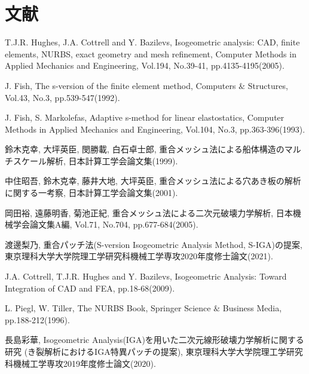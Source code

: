 \chapter{文献}
\begin{list}{}{\setlength{\leftmargin}{2em}\setlength{\itemindent}{-2em}\setlength{\topsep}{0pt}}
 \item T.J.R. Hughes,
       J.A. Cottrell and Y. Bazilevs,
       Isogeometric analysis: CAD,
       finite elements,
       NURBS,
       exact geometry and mesh refinement,
       Computer Methods in Applied Mechanics and Engineering,
       Vol.194,
       No.39-41,
       pp.4135-4195(2005).
\item  J. Fish,
       The s-version of the finite element method,
       Computers $\&$ Structures,
       Vol.43,
       No.3,
       pp.539-547(1992).
\item  J. Fish,
       S. Markolefas,
       Adaptive s-method for linear elastostatics,
       Computer Methods in Applied Mechanics and Engineering,
       Vol.104,
       No.3,
       pp.363-396(1993).
\item  鈴木克幸,
       大坪英臣,
       閔勝載,
       白石卓士郎,
       重合メッシュ法による船体構造のマルチスケール解析,
       日本計算工学会論文集(1999).
\item  中住昭吾,
       鈴木克幸,
       藤井大地,
       大坪英臣,
       重合メッシュ法による穴あき板の解析に関する一考察,
       日本計算工学会論文集(2001).
\item  岡田裕,
       遠藤明香,
       菊池正紀,
       重合メッシュ法による二次元破壊力学解析,
       日本機械学会論文集A編,
       Vol.71,
       No.704,
       pp.677-684(2005).
\item  渡邊梨乃,
       重合パッチ法(S-version Isogeometric Analysis Method, S-IGA)の提案,
       東京理科大学大学院理工学研究科機械工学専攻2020年度修士論文(2021).
\item  J.A. Cottrell, T.J.R. Hughes and Y. Bazilevs,
       Isogeometric Analysis: Toward Integration of CAD and FEA,
       pp.18-68(2009).
\item  L. Piegl,
       W. Tiller,
       The NURBS Book,
       Springer Science $\&$ Business Media,
       pp.188-212(1996).
 \item 長島彩華,
       Isogeometric Analysis(IGA)を用いた二次元線形破壊力学解析に関する研究
       (き裂解析におけるIGA特異パッチの提案),
       東京理科大学大学院理工学研究科機械工学専攻2019年度修士論文(2020).
\end{list}